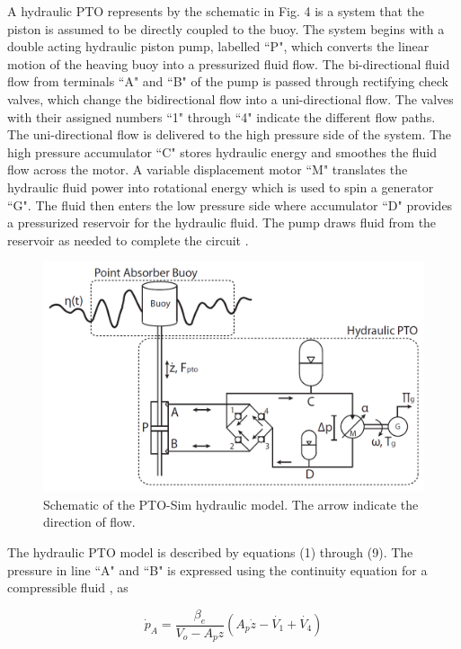 \documentclass[conference]{IEEEtran}
\begin{document}
A hydraulic PTO represents by the schematic in Fig. 4 is a system that the piston is assumed to be directly coupled to the buoy. The system begins with  a double acting hydraulic piston pump, labelled ``P", which converts the linear motion of the heaving buoy into a pressurized fluid flow. The bi-directional fluid flow from terminals ``A" and ``B" of the pump is passed through rectifying check valves, which change the bidirectional flow into a uni-directional flow. The valves with their assigned numbers ``1" through ``4" indicate the different flow paths. The uni-directional flow is delivered to the high pressure side of the system. The high pressure accumulator ``C" stores hydraulic energy and smoothes the fluid flow across the motor. A variable displacement motor ``M" translates the hydraulic fluid power into rotational energy which is used to spin a generator ``G". The fluid then enters the low pressure side where accumulator ``D" provides a pressurized reservoir for the hydraulic fluid. The pump draws fluid from the reservoir as needed to complete the circuit \cite{casey2013modeling}.

\begin{figure}[t]
    \centering
    \includegraphics[width=1\columnwidth]{Images/HydraulicPTO}
    \caption{Schematic of the PTO-Sim hydraulic model. The arrow indicate the direction of flow.}
    \end{figure}



The hydraulic PTO model is described by equations (1) through (9). The pressure in line ``A" and ``B" is expressed using the continuity equation for a compressible fluid \cite{merritthydraulic}, as 

\begin{equation}
\dot{p}_A=\frac{\beta_e}{V_o-A_pz}(A_p\dot{z}-\dot{V_1}+\dot{V_4}) 
\end{equation}
\end{document}
